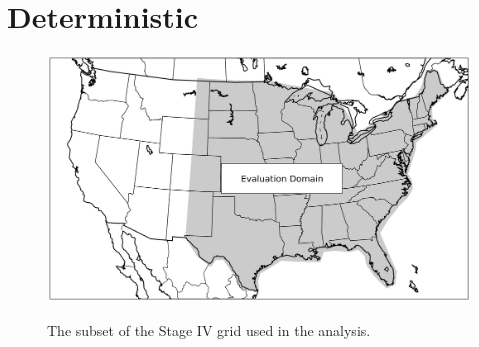 

\chapter{Deterministic}
\label{deterministic}









\newpage
\begin{figure}[cc]
    \centering
    \includegraphics[width=35pc, angle=0]{./deterministic/figs/domain.png}\\
    \caption{The subset of the Stage IV grid used in the analysis.}
    \label{domain}
\end{figure}


